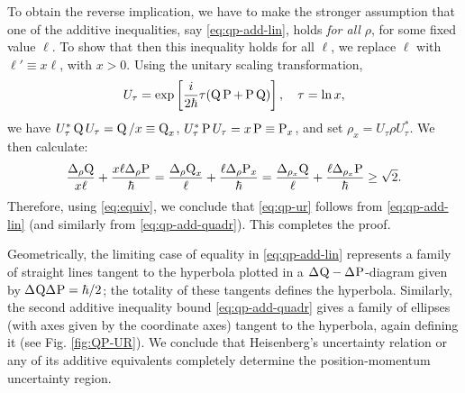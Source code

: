 To obtain the reverse implication, we have to make the stronger assumption that one of the additive inequalities, say \eqref{eq:qp-add-lin}, holds {\em for all} $\rho$, for some fixed value $\ell$. To show that then this inequality holds for all $\ell$, we replace $\ell$ with $\ell'\equiv x\ell$,  with $x>0$. Using the unitary scaling transformation,
\begin{equation}
  U_\tau=\exp\left[\frac{i}{2\hbar} \tau(\operatorname{Q}\operatorname{P}+\operatorname{P}\operatorname{Q})\right],\quad \tau=\ln x,
\end{equation}
we have $U_\tau^* \operatorname{Q} U_\tau=\operatorname{Q}/x\equiv \operatorname{Q}_x$, $U_\tau^* \operatorname{P} U_\tau=x\operatorname{P}\equiv \operatorname{P}_x$, and set $\rho_x = U_\tau \rho U_\tau^*$. We then calculate:
\begin{align}
  \frac{\sdevr{\opq}}{x\ell}+\frac{x\ell\sdevr{\opp}}{\hbar}=
  \frac{\sdevr{\opq_x}}{\ell}+\frac{\ell\sdevr{\opp_x}}{\hbar}
  =\frac{\sdev[\rho_x]{\opq} }{\ell}+\frac{\ell\sdev[\rho_x]{\opp}}{\hbar}\ge \sqrt{2}.
\end{align}
Therefore, using \eqref{eq:equiv}, we conclude that \eqref{eq:qp-ur} follows from \eqref{eq:qp-add-lin} (and similarly from \eqref{eq:qp-add-quadr}). This completes the proof.

Geometrically, the limiting case of equality in \eqref{eq:qp-add-lin} represents a family of straight lines tangent to the hyperbola plotted in a $\sdev{\opq}-\sdev{\opp}$-diagram given by $\sdev{\opq}\sdev{\opp}=\hbar/2$; the totality of these tangents defines the hyperbola. Similarly, the second additive inequality bound \eqref{eq:qp-add-quadr} gives a family of ellipses (with axes given by the coordinate axes) tangent to the hyperbola, again defining it (see Fig. \ref{fig:QP-UR}). We conclude that Heisenberg's uncertainty relation or any of its additive equivalents completely determine the position-momentum uncertainty region.



